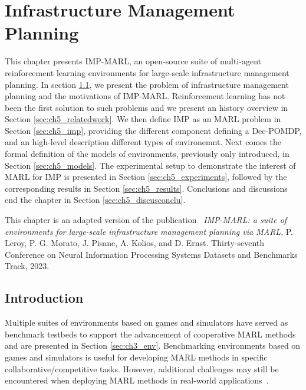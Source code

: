 \chapter{Infrastructure Management Planning}\label{ch:impmarl}

\begin{chapter_outline}

This chapter presents IMP-MARL, an open-source suite of multi-agent reinforcement learning environments for large-scale infrastructure management planning.
In section \ref{sec:ch5_intro}, we present the problem of infrastructure management planning and the motivations of IMP-MARL.
Reinforcement learning has not been the first solution to such problems and we present an history overview in Section \ref{sec:ch5_relatedwork}.
We then define IMP as an MARL problem in Section \ref{sec:ch5_imp}, providing the different component defining a Dec-POMDP, and an high-level description different types of environemnt.
Next comes the formal definition of the models of environments, previously only introduced, in Section \ref{sec:ch5_models}.
The experimental setup to demonstrate the interest of MARL for IMP is presented in Section \ref{sec:ch5_experiments}, followed by the corresponding results in Section \ref{sec:ch5_results}.
Conclusions and discussions end the chapter in Section \ref{sec:ch5_discusconclu}.

This chapter is an adapted version of the publication~\citep{leroy2023impmarl} \textit{IMP-MARL: a suite of environments for large-scale infrastructure management planning via MARL}, P. Leroy, P. G. Morato, J. Pisane, A. Kolios, and D. Ernst. Thirty-seventh Conference on Neural Information Processing Systems Datasets and Benchmarks Track, 2023.
\end{chapter_outline}

\section{Introduction}\label{sec:ch5_intro}
Multiple suites of environments based on games and simulators have served as benchmark testbeds to support the advancement of cooperative MARL methods and are presented in Section \ref{sec:ch3_env}.
Benchmarking environments based on games and simulators is useful for developing MARL methods in specific collaborative/competitive tasks.
However, additional challenges may still be encountered when deploying MARL methods in real-world applications~\citep{oroojlooy2022review}.

